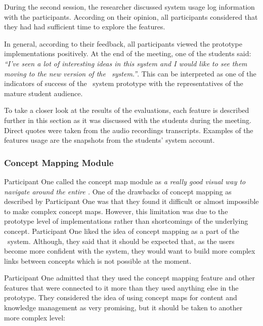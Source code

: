 During the second session, the researcher discussed system usage log information
with the participants. According on their opinion, all participants considered
that they had had sufficient time to explore the features. 

In general, according to their feedback, all participants viewed the prototype
implementations positively. At the end of the meeting, one of the students said:
\textit{``I've seen a lot of interesting ideas in this system and I would like
to see them moving to the new version of the \ep~system.''}. This can be
interpreted as one of the indicators of success of the \ep~system prototype with
the representatives of the mature student audience.

To take a closer look at the results of the evaluations, each feature is
described further in this section as it was discussed with the students during
the meeting. Direct quotes were taken from the audio recordings transcripts.
Examples of the features usage are the snapshots from the students' system
account.

\subsubsection{Concept Mapping Module}

Participant One called the concept map module as \textit{a really good visual
way to navigate around the entire \ep.} One of the drawbacks of concept mapping
as described by Participant One was that they found it difficult or almost
impossible to make complex concept maps. However, this limitation was due to the
prototype level of implementations rather than shortcomings of the underlying
concept. Participant One liked the idea of concept mapping as a part of the
\ep~system. Although, they said that it should be expected that, as the users
become more confident with the system, they would want to build more complex
links between concepts which is not possible at the moment.

Participant One admitted that they used the concept mapping feature and other
features that were connected to it more than they used anything else in the
prototype. They considered the idea of using concept maps for content and
knowledge management as very promising, but it should be taken to another more
complex level:


